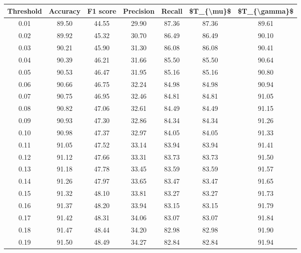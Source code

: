 \begin{tabular}{|c|c|c|c|c|c|c|}
\hline
 Threshold &  Accuracy &  F1 score &  Precision &  Recall &  \$T\_\{\textbackslash mu\}\$ &  \$T\_\{\textbackslash gamma\}\$ \\
\hline
      0.01 &     89.50 &     44.55 &      29.90 &   87.36 &      87.36 &         89.61 \\
      0.02 &     89.92 &     45.32 &      30.70 &   86.49 &      86.49 &         90.10 \\
      0.03 &     90.21 &     45.90 &      31.30 &   86.08 &      86.08 &         90.41 \\
      0.04 &     90.39 &     46.21 &      31.66 &   85.50 &      85.50 &         90.64 \\
      0.05 &     90.53 &     46.47 &      31.95 &   85.16 &      85.16 &         90.80 \\
      0.06 &     90.66 &     46.75 &      32.24 &   84.98 &      84.98 &         90.94 \\
      0.07 &     90.75 &     46.95 &      32.46 &   84.81 &      84.81 &         91.05 \\
      0.08 &     90.82 &     47.06 &      32.61 &   84.49 &      84.49 &         91.15 \\
      0.09 &     90.93 &     47.30 &      32.86 &   84.34 &      84.34 &         91.26 \\
      0.10 &     90.98 &     47.37 &      32.97 &   84.05 &      84.05 &         91.33 \\
      0.11 &     91.05 &     47.52 &      33.14 &   83.94 &      83.94 &         91.41 \\
      0.12 &     91.12 &     47.66 &      33.31 &   83.73 &      83.73 &         91.50 \\
      0.13 &     91.18 &     47.78 &      33.45 &   83.59 &      83.59 &         91.57 \\
      0.14 &     91.26 &     47.97 &      33.65 &   83.47 &      83.47 &         91.65 \\
      0.15 &     91.32 &     48.10 &      33.81 &   83.27 &      83.27 &         91.73 \\
      0.16 &     91.37 &     48.20 &      33.94 &   83.15 &      83.15 &         91.79 \\
      0.17 &     91.42 &     48.31 &      34.06 &   83.07 &      83.07 &         91.84 \\
      0.18 &     91.47 &     48.44 &      34.20 &   82.98 &      82.98 &         91.90 \\
      0.19 &     91.50 &     48.49 &      34.27 &   82.84 &      82.84 &         91.94 \\

\end{tabular}

